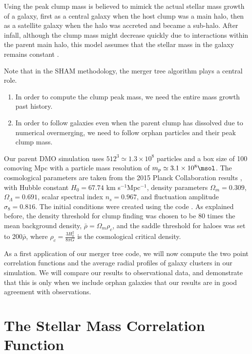 Using the  peak clump mass  is believed  to mimick the  actual stellar
mass growth of a galaxy, first as a central galaxy when the host clump
was a main halo, then as a satellite galaxy when the halo was accreted
and became  a sub-halo.  After  infall, although the clump  mass might
decrease quickly due to interactions within the parent main halo, this
model assumes  that the  stellar mass in  the galaxy  remains constant
\citep{nagaiRadialDistributionGalaxies2005}.

Note that in  the SHAM methodology, the merger tree  algorithm plays a
central role.
\begin{enumerate}
\item In order to compute the clump peak mass, we need the entire mass
  growth past history.
\item  In order  to follow  galaxies even  when the  parent clump  has
  dissolved due  to numerical  overmerging, we  need to  follow orphan
  particles and their peak clump mass.
\end{enumerate}

Our parent DMO simulation uses $512^3 \simeq 1.3\times 10^8$ particles
and a box size of 100 comoving  Mpc with a particle mass resolution of
$m_p \simeq  3.1 \times  10^8\msol$.  The cosmological  parameters are
taken from  the 2015 Planck Collaboration  results \citep{planckcollaborationPlanck2015Results2016},
with  Hubble constant  $H_0  = 67.74$  km s$^{-1}$Mpc$^{-1}$,  density
parameters  $\Omega_m  =  0.309$,  $\Omega_\Lambda  =  0.691$,  scalar
spectral index  $n_s = 0.967$,  and fluctuation amplitude  $\sigma_8 =
0.816$.  The initial conditions  were created using the 
code \citep{hahnMultiscaleInitialConditions2011}.   As explained  before, the density  threshold for
clump finding was  chosen to be 80 times the  mean background density,
$\bar{\rho} =  \Omega_m \rho_c$, and  the saddle threshold  for haloes
was set to  200$\bar{\rho}$, where $\rho_c = \frac{3  H_0^2}{8 \pi G}$
is the cosmological critical density.

As a  first application of our  merger tree code, we  will now compute
the two point correlation functions and the average radial profiles of
galaxy  clusters in  our simulation.  We will  compare our  results to
observational data, and demonstrate that  this is only when we include
orphan  galaxies  that   our  results  are  in   good  agreement  with
observations.

\section{The Stellar Mass Correlation Function}\label{chap:correlation}

